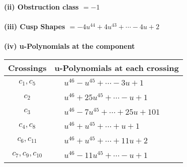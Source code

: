 \documentclass[1p]{elsarticle_modified}
\theoremstyle{definition}
\begin{document}
\flushleft \textbf{(ii) Obstruction class $= -1$}\\~\\
\flushleft \textbf{(iii) Cusp Shapes $= -4 u^{44}+4 u^{43}+\cdots-4 u+2$}\\~\\
\newpage\renewcommand{\arraystretch}{1}
\flushleft \textbf{(iv) u-Polynomials at the component}\newline \\
\begin{tabular}{m{50pt}|m{274pt}}
Crossings & \hspace{64pt}u-Polynomials at each crossing \\
\hline $$\begin{aligned}c_{1},c_{5}\end{aligned}$$&$\begin{aligned}
&u^{46}- u^{45}+\cdots-3 u+1
\end{aligned}$\\
\hline $$\begin{aligned}c_{2}\end{aligned}$$&$\begin{aligned}
&u^{46}+25 u^{45}+\cdots- u+1
\end{aligned}$\\
\hline $$\begin{aligned}c_{3}\end{aligned}$$&$\begin{aligned}
&u^{46}-7 u^{45}+\cdots+25 u+101
\end{aligned}$\\
\hline $$\begin{aligned}c_{4},c_{8}\end{aligned}$$&$\begin{aligned}
&u^{46}+u^{45}+\cdots+u+1
\end{aligned}$\\
\hline $$\begin{aligned}c_{6},c_{11}\end{aligned}$$&$\begin{aligned}
&u^{46}+u^{45}+\cdots+11 u+2
\end{aligned}$\\
\hline $$\begin{aligned}c_{7},c_{9},c_{10}\end{aligned}$$&$\begin{aligned}
&u^{46}-11 u^{45}+\cdots- u+1
\end{aligned}$\\
\hline
\end{tabular}\\~\\
\end{document}
